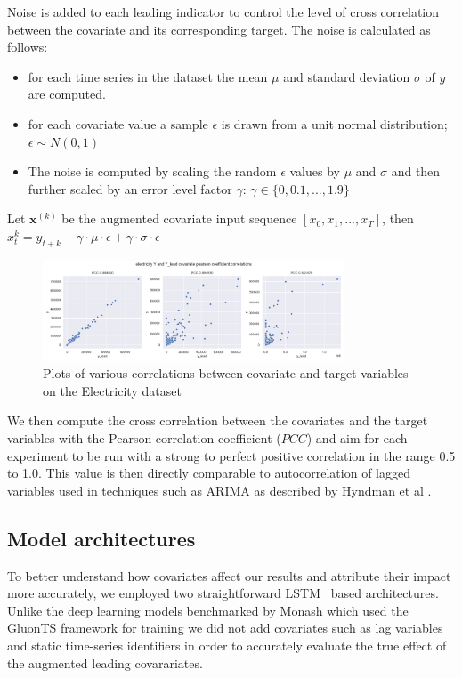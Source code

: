 \documentclass[letterpaper]{article}
\newcommand{\pearson}{PCC}
\begin{document}
Noise is added to each leading indicator to control the level of cross correlation between the covariate and its 
corresponding target. The noise is calculated as follows: 

\begin{itemize}
\item for each time series in the dataset the mean $\mu$ and standard deviation $\sigma$ of $y$ are computed.
\item for each covariate value a sample $\epsilon$ is drawn from a unit normal distribution; $\epsilon \sim N(0,1)$ 
\item The noise is computed by scaling the random $\epsilon$ values by $\mu$ and $\sigma$ and then further
scaled by an error level factor $\gamma$:
$\gamma \in \{0, 0.1, ..., 1.9\}$
\end{itemize}
Let $\mathbf{x}^{(k)}$ be the augmented covariate input sequence $[x_0, x_1, ..., x_T]$, 
then $x^{k}_t = y_{t+k} + \gamma \cdot \mu \cdot \epsilon + \gamma \cdot \sigma \cdot \epsilon $
\begin{figure}[ht]
\centering
\includegraphics[width=0.8\textwidth]{figures/electricity-pcc.png}
\caption{Plots of various correlations between covariate and target variables on the Electricity dataset}
\label{fig:my_label}
\end{figure}
We then compute the cross correlation between the covariates and the target variables with the Pearson correlation coefficient ($\pearson$) 
and aim for each experiment to be run with a strong to perfect positive correlation in the range 0.5 to 1.0. This value is then directly 
comparable to autocorrelation of lagged variables used in techniques such as ARIMA as described by Hyndman et al \cite{hyndman2021forecasting}.

\subsection{Model architectures}
To better understand how covariates affect our results and attribute their impact more accurately, 
we employed two straightforward LSTM~\cite{HochSchm97} based architectures. Unlike the deep learning models benchmarked 
by Monash \cite{DBLP:conf/nips/GodahewaBWHM21} which used the GluonTS \cite{gluonts_arxiv} framework 
for training we did not add covariates such as lag variables and static time-series identifiers in order to 
accurately evaluate the true effect of the augmented leading covarariates. 
\end{document}
